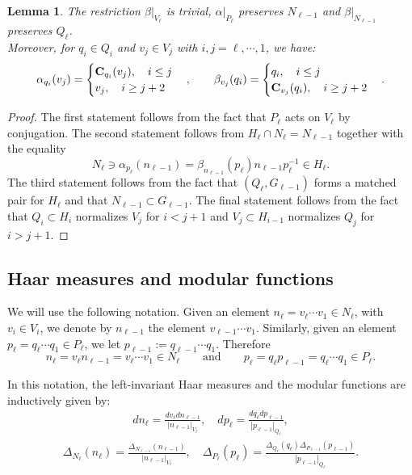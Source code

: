 \documentclass[a4paper,11pt,reqno]{amsart}
\numberwithin{equation}{section}
\newtheorem{lemma}[theorem]{Lemma}
\theoremstyle{remark}
\theoremstyle{definition}
\begin{document}
\begin{lemma}
\label{CaseS}
The restriction $\beta\big|_{V_\ell} $ is trivial,
  $\alpha\big|_{P_\ell}$ preserves $N_{\ell-1}$ and $\beta\big|_{N_{\ell-1}}$ preserves $Q_\ell$.\\
 Moreover, for $q_i\in Q_i$ and $v_j\in V_j$ with $i,j=\ell,\cdots,1$, we have:
$$
\alpha_{q_i}(v_j)=\begin{cases}
{\bf C}_{q_i}(v_j),\quad i\leq j\\
v_j,\quad i\geq j+2
\end{cases},\qquad
\beta_{v_j}(q_i)=\begin{cases}
q_i,\quad i\leq j\\
{\bf C}_{v_j}(q_i),\quad i\geq j+2
\end{cases}.
$$
\end{lemma}
\begin{proof}
The first statement follows from the fact that $P_\ell$ acts on $V_\ell$ by conjugation.
The second statement follows from $H_\ell\cap N_\ell=N_{\ell-1}$ together with the equality
$$
N_\ell\ni \alpha_{p_\ell}(n_{\ell-1})=\beta_{n_{\ell-1}}(p_\ell)n_{\ell-1}p_\ell^{-1}\in H_\ell.
$$
The third statement follows from the fact that $(Q_\ell,G_{\ell-1})$ forms a matched pair for $H_\ell$ and that $N_{\ell-1}\subset G_{\ell-1}$.
The final statement follows from the fact that $Q_i\subset H_i$ normalizes $V_j$ for $i<j+1$ and $V_j\subset H_{i-1}$ normalizes $Q_j$
for $i>j+1$.
\end{proof}

\subsection{Haar measures and modular functions}
We will use the following notation. Given an element $n_\ell=v_\ell\cdots v_1\in N_\ell$, with $v_i\in V_i$, we denote by $n_{\ell-1}$ the element $v_{\ell-1}\cdots v_1$. Similarly, given an element $p_\ell=q_\ell\cdots q_1\in P_\ell$, we let $p_{\ell-1}:=q_{\ell-1}\cdots q_1$. Therefore
\begin{equation}
\label{NormPN}
n_\ell=v_\ell n_{\ell-1}=v_\ell\cdots v_1\in N_\ell \qquad\mbox{and}\qquad p_\ell=q_\ell p_{\ell-1}=q_\ell\cdots q_1\in P_\ell.
\end{equation}

In this notation, the  left-invariant  Haar measures and the modular functions
are inductively given by:
\begin{align}
\label{HMPN}
 dn_\ell=\frac{dv_\ell dn_{\ell-1}}{|n_{\ell-1}|_{V_\ell}},
\quad
dp_\ell=\frac{dq_\ell dp_{\ell-1}}{|p_{\ell-1}|_{Q_\ell}},
 \end{align}
\begin{align}
\label{MFPN}
\Delta_{N_\ell}(n_\ell)=\frac{\Delta_{N_{\ell-1}}(n_{\ell-1})}{|n_{\ell-1}|_{V_\ell}}, \quad
\Delta_{P_\ell}(p_\ell)=\frac{\Delta_{Q_\ell}(q_\ell)\Delta_{P_{\ell-1}}(p_{\ell-1}) }{ |p_{\ell-1}|_{Q_\ell}}.
\end{align}
\end{document}
